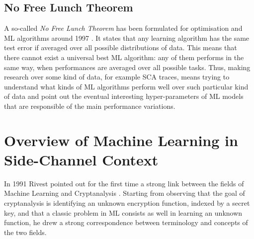\subsection{No Free Lunch Theorem}\label{sec:NFL}
A so-called \emph{No Free Lunch Theorem} has been formulated for optimisation and ML algorithms around 1997 \cite{wolpert1997no}. It states that any learning algorithm has the same test error if averaged over all possible distributions of data. This means that there cannot exist a universal best ML algorithm: any of them performs in the same way, when performances are averaged over all possible tasks. Thus, making research over some kind of data, for example SCA traces, means trying to understand what kinds of ML algorithms perform well over such particular kind of data and point out the eventual interesting hyper-parameters of ML models that are responsible of the main performance variations. 




\section{Overview of Machine Learning in Side-Channel Context}
In 1991 Rivest pointed out for the first time a strong link between the fields of Machine Learning and Cryptanalysis \cite{rivest1991cryptography}. Starting from observing that the goal of cryptanalysis is identifying an unknown encryption function, indexed by a secret key, and that a classic problem in ML consists as well in learning an unknown function, he drew a strong correspondence between terminology and concepts of the two fields.\\


